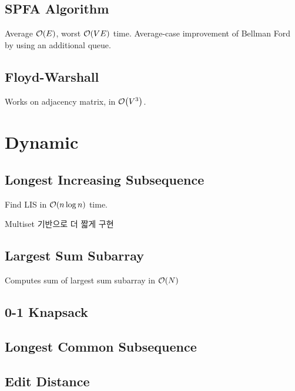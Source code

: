 \documentclass[landscape,8pt]{article}
\begin{document}
\begin{multicols}{2}
  \subsection{SPFA Algorithm}
    Average $\order{E}$, worst $\order{VE}$ time. Average-case improvement of Bellman Ford by using an additional queue.
      
  \subsection{Floyd-Warshall}
    Works on adjacency matrix, in $\order{V^3}$.
      

\columnbreak

\section{Dynamic}
  \subsection{Longest Increasing Subsequence}
    Find LIS in $\order{n \log n}$ time.
      
    Multiset 기반으로 더 짧게 구현
      

  \subsection{Largest Sum Subarray}
    Computes sum of largest sum subarray in $\order{N}$
      

  \subsection{0-1 Knapsack}
    

  \subsection{Longest Common Subsequence}
    

  \subsection{Edit Distance}
    


\end{multicols}
\end{document}
